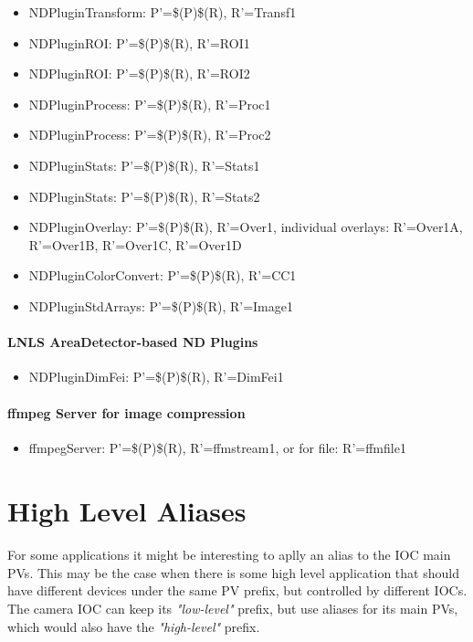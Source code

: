 \documentclass[openany]{article}
\begin{document}
        \begin{itemize}
          \item NDPluginTransform: P'=\$(P)\$(R), R'=Transf1
          \item NDPluginROI: P'=\$(P)\$(R), R'=ROI1
          \item NDPluginROI: P'=\$(P)\$(R), R'=ROI2
          \item NDPluginProcess: P'=\$(P)\$(R), R'=Proc1
          \item NDPluginProcess: P'=\$(P)\$(R), R'=Proc2
          \item NDPluginStats: P'=\$(P)\$(R), R'=Stats1
          \item NDPluginStats: P'=\$(P)\$(R), R'=Stats2
          \item NDPluginOverlay: P'=\$(P)\$(R), R'=Over1, individual overlays: R'=Over1A, R'=Over1B, R'=Over1C, R'=Over1D
          \item NDPluginColorConvert: P'=\$(P)\$(R), R'=CC1
          \item NDPluginStdArrays: P'=\$(P)\$(R), R'=Image1
        \end{itemize}

        \paragraph{LNLS AreaDetector-based ND Plugins}

        \begin{itemize}
          \item NDPluginDimFei: P'=\$(P)\$(R), R'=DimFei1
        \end{itemize}

        \paragraph{ffmpeg Server for image compression}

        \begin{itemize}
          \item ffmpegServer: P'=\$(P)\$(R), R'=ffmstream1, or for file: R'=ffmfile1
        \end{itemize}

\section{High Level Aliases}\label{sec:high-level-aliases}

    \paragraph{} For some applications it might be interesting to aplly an alias to the IOC main PVs. This may be the case when there is some high level application that should have different devices under the same PV prefix, but controlled by different IOCs. The camera IOC can keep its \emph{"low-level"} prefix, but use aliases for its main PVs, which would also have the \emph{"high-level"} prefix.
\end{document}
